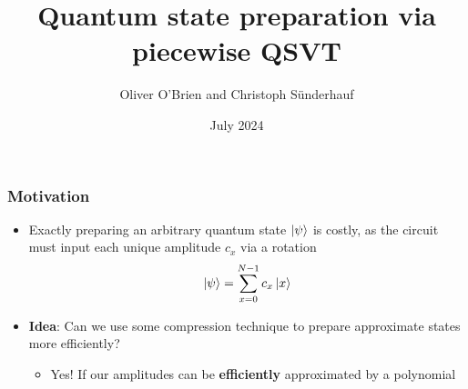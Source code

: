 \documentclass{beamer}
\title[Piecewise QSVT Data Loading]{Quantum state preparation via piecewise QSVT\footfullcite{obrien2024quantumstatepreparationpiecewise}}
\author[O. O'Brien, C. Sünderhauf] %
{Oliver O'Brien and Christoph Sünderhauf}
\institute{Riverlane}
\date{July 2024}
\begin{document}
\frame{\titlepage}

\begin{frame}
\frametitle{Motivation}
\begin{itemize}
    \item Exactly preparing an arbitrary quantum state $\ket{\psi}$ is costly, as the circuit must input each unique amplitude $c_x$ via a rotation
    $$
    \ket{\psi} =  \sum_{x=0}^{N-1} c_x \ket{x}
    $$
    \pause
    \item \textbf{Idea}: Can we use some compression technique to prepare approximate states more efficiently? 
    \pause
    \begin{itemize}
        \item Yes! If our amplitudes can be \textbf{efficiently} approximated by a polynomial 
    \end{itemize}
\end{itemize}
\end{frame}
\end{document}
